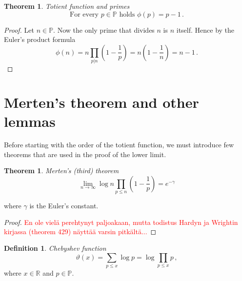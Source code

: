 \documentclass{article}
\theoremstyle{definition}
\newtheorem{definition}[subsubsection]{Definition}
\newtheorem{theorem}[subsubsection]{Theorem}
\begin{document}
\begin{theorem}{\emph{Totient function and primes}}
\label{thm:phiprime}
\begin{equation*}
    \text{For every } p \in \mathbb{P} \text{ holds } \phi(p) = p-1\,.
\end{equation*}

\begin{proof}

Let $n\in\mathbb{P}$. Now the only prime that divides $n$ is $n$ itself. Hence by the Euler's product formula
\begin{equation*}
    \phi(n) = n \prod_{p \vert n} (1 - \frac{1}{p}) = n\left(1-\frac{1}{n}\right) = n-1\,.
\end{equation*}

\end{proof}

\end{theorem}

\section{Merten's theorem and other lemmas}

Before starting with the order of the totient function, we must introduce few theorems that are used in the proof of the lower limit.

\begin{theorem}{\emph{Merten's (third) theorem}}
\label{thm:mertens}
\begin{equation*}
    \lim_{n \rightarrow \infty} \log n \prod_{p\leq n} \left(1-\frac{1}{p}\right) = e^{-\gamma}
\end{equation*}

where $\gamma$ is the Euler's constant.

\begin{proof}

\textcolor{red}{En ole vielä perehtynyt paljoakaan, mutta todistus Hardyn ja Wrightin kirjassa (theorem 429) näyttää varsin pitkältä...}

\end{proof}

\end{theorem}

\begin{definition}{\emph{Chebyshev function}}
\begin{equation*}
    \vartheta(x)=\sum_{p\leq x} \log p = \log \prod_{p\leq x} p\,,
\end{equation*}
where $x\in\mathbb{R}$ and $p\in\mathbb{P}$.

\end{definition}
\end{document}
